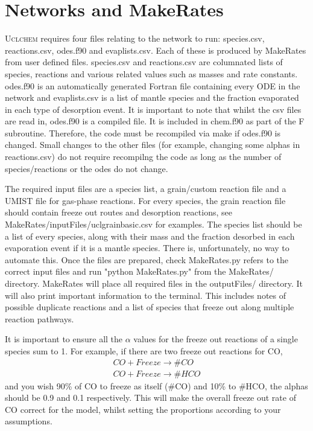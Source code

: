 \documentclass{llncs}
\begin{document}
\section{Networks and MakeRates}
\label{sec:network}
\textsc{Uclchem} requires four files relating to the network to run: species.csv, reactions.csv, odes.f90 and evaplists.csv. Each of these is produced by MakeRates from user defined files. species.csv and reactions.csv are columnated lists of species, reactions and various related values such as masses and rate constants. odes.f90 is an automatically generated Fortran file containing every ODE in the network and evaplists.csv is a list of mantle species and the fraction evaporated in each type of desorption event. It is important to note that whilst the csv files are read in, odes.f90 is a compiled file. It is included in chem.f90 as part of the F subroutine. Therefore, the code must be recompiled via make if odes.f90 is changed. Small changes to the other files (for example, changing some alphas in reactions.csv) do not require recompilng the code as long as the number of species/reactions or the odes do not change. \par
The required input files are a species list, a grain/custom reaction file and a UMIST file for gas-phase reactions. For every species, the grain reaction file should contain freeze out routes and desorption reactions, see MakeRates/inputFiles/uclgrainbasic.csv for examples. The species list should be a list of every species, along with their mass and the fraction desorbed in each evaporation event if it is a mantle species. There is, unfortunately, no way to automate this. Once the files are prepared, check MakeRates.py refers to the correct input files and run "python MakeRates.py" from the MakeRates/ directory. MakeRates will place all required files in the outputFiles/ directory. It will also print important information to the terminal. This includes notes of possible duplicate reactions and a list of species that freeze out along multiple reaction pathways. \par
It is important to ensure all the $\alpha$ values for the freeze out reactions of a single species sum to 1. For example, if there are two freeze out reactions for CO,
\begin{eqnarray}
CO + Freeze \rightarrow \#CO \\
CO + Freeze \rightarrow \#HCO
\end{eqnarray}
 and you wish 90\% of CO to freeze as itself (\#CO) and 10\% to \#HCO, the alphas should be 0.9 and 0.1 respectively. This will make the overall freeze out rate of CO correct for the model, whilst setting the proportions according to your assumptions.     
%
%
\end{document}
